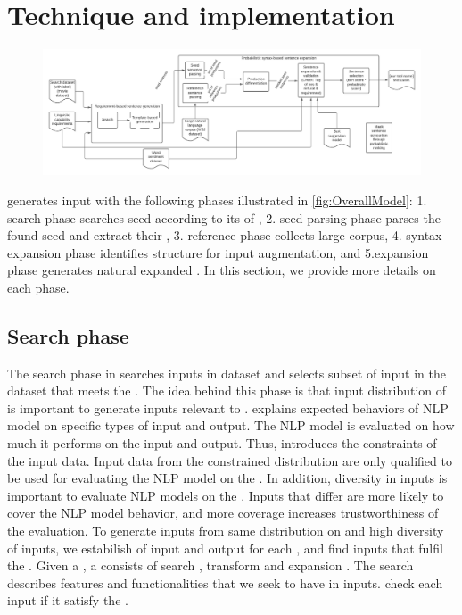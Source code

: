 \section{Technique and implementation}

\begin{figure}
  \centering
  \includegraphics[scale=0.5]{figs/overview.pdf}
  \vspace{-5pt}
  \caption{\OverallModelFigCaption}
  \vspace{-10pt}
\end{figure}

\Model generates input \sents with the following phases illustrated in
\ref{fig:OverallModel}: 1. search phase searches seed \sents according
to its \req of \lc, 2. seed parsing phase parses the found seed \sents
and extract their \cfg, 3. reference phase collects large corpus,
4. syntax expansion phase identifies structure for input augmentation,
and 5.\sent expansion phase generates natural expanded \sent. In this
section, we provide more details on each phase.

\subsection{Search phase}
The search phase in \Model searches inputs in dataset and selects
subset of input \sents in the dataset that meets the \lc
\req. The idea behind this phase is that input distribution of
\lc is important to generate inputs relevant to \lc. \Lc explains
expected behaviors of NLP model on specific types of input and
output. The NLP model is evaluated on how much it performs on the
input and output. Thus, \lc introduces the constraints of the input
data. Input data from the constrained distribution are only qualified
to be used for evaluating the NLP model on the \lc.  In addition,
diversity in inputs is important to evaluate NLP models on the
\lc. Inputs that differ are more likely to cover the NLP model
behavior, and more coverage increases trustworthiness of the
evaluation. To generate inputs from same distribution on \lc and high
diversity of inputs, we estabilish \reqs of input and output
for each \lc, and find inputs that fulfil the \reqs. Given a
\lc, a \req consists of search \req, transform
\req and expansion \req. The search \req
describes features and functionalities that we seek to have in
inputs. \Model check each input if it satisfy the \req.


